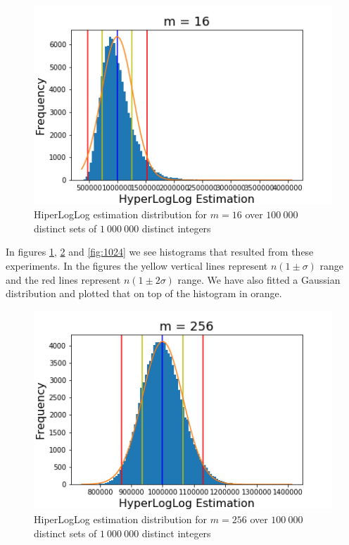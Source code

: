 \documentclass{tufte-handout}
\begin{document}
\begin{figure}[!h]
  \includegraphics[width = \textwidth]{figs/ex416}
  \caption{HiperLogLog estimation distribution for $m = 16$ over $100\ 000$ distinct sets of $1\ 000\ 000$ distinct integers}
  \label{fig:16}
\end{figure}
\noindent In figures \ref{fig:16}, \ref{fig:256} and \ref{fig:1024} we see histograms that resulted from these experiments. In the figures the yellow vertical lines represent $n(1\pm\sigma)$ range and the red lines represent $n(1\pm2\sigma)$ range. We have also fitted a Gaussian distribution and plotted that on top of the histogram in orange.
\begin{figure}[h!]
  \includegraphics[width = \textwidth]{figs/ex4256}
  \caption{HiperLogLog estimation distribution for $m = 256$ over $100\ 000$ distinct sets of $1\ 000\ 000$ distinct integers}
  \label{fig:256}
\end{figure}
\end{document}
